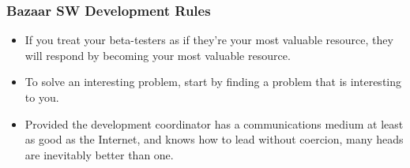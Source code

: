 \documentclass[hyperref={pdfpagelabels=false},xcolor=pst,pdf,fragile]{beamer}
\begin{document}
\begin{frame}
  \frametitle{Bazaar SW Development Rules}

  \begin{itemize}
	\item If you treat your beta-testers as if they're your most valuable
	  resource, they will respond by becoming your most valuable resource.

	\item To solve an interesting problem, start by finding a problem that
	  is interesting to you.

	\item Provided the development coordinator has a communications medium
	  at least as good as the Internet, and knows how to lead without
	  coercion, many heads are inevitably better than one.

  \end{itemize}

%
%
%
%
%
%
%
%
%
%

\end{frame}
\end{document}
